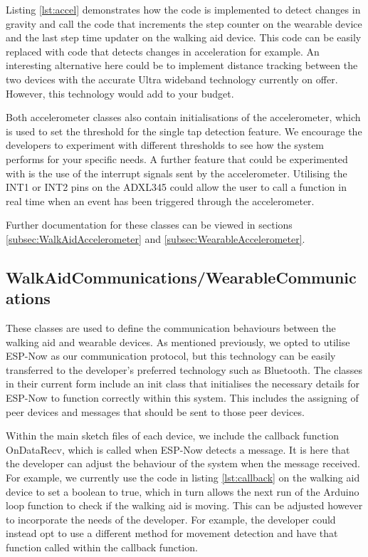 				Listing \ref{lst:accel} demonstrates how the code is implemented to detect changes in gravity and call the code that increments the step counter on the wearable device and the last step time updater on the walking aid device. This code can be easily replaced with code that detects changes in acceleration for example. An interesting alternative here could be to implement distance tracking between the two devices with the accurate Ultra wideband technology currently on offer. However, this technology would add to your budget. 

				

				Both accelerometer classes also contain initialisations of the accelerometer, which is used to set the threshold for the single tap detection feature. We encourage the developers to experiment with different thresholds to see how the system performs for your specific needs. A further feature that could be experimented with is the use of the interrupt signals sent by the accelerometer. Utilising the INT1 or INT2 pins on the ADXL345 could allow the user to call a function in real time when an event has been triggered through the accelerometer.

				Further documentation for these classes can be viewed in sections \ref{subsec:WalkAidAccelerometer} and \ref{subsec:WearableAccelerometer}.

			\subsection{WalkAidCommunications/WearableCommunications}

				These classes are used to define the communication behaviours between the walking aid and wearable devices. As mentioned previously, we opted to utilise ESP-Now as our communication protocol, but this technology can be easily transferred to the developer's preferred technology such as Bluetooth. The classes in their current form include an init class that initialises the necessary details for ESP-Now to function correctly within this system. This includes the assigning of peer devices and messages that should be sent to those peer devices. 

				Within the main sketch files of each device, we include the callback function OnDataRecv, which is called when ESP-Now detects a message. It is here that the developer can adjust the behaviour of the system when the message received. For example, we currently use the code in listing \ref{lst:callback} on the walking aid device to set a boolean to true, which in turn allows the next run of the Arduino loop function to check if the walking aid is moving. This can be adjusted however to incorporate the needs of the developer. For example, the developer could instead opt to use a different method for movement detection and have that function called within the callback function.

